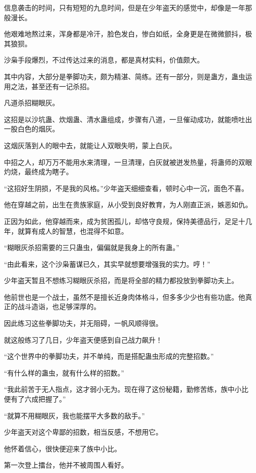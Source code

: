 \begin{this_body}
信息袭击的时间，只有短短的九息时间，但是在少年盗天的感觉中，却像是一年那般漫长。

他艰难地熬过来，浑身都是冷汗，脸色发白，惨白如纸，全身更是在微微颤抖，极其狼狈。

沙枭手段爆烈，不过传达过来的消息，都是真材实料，价值颇大。

其中内容，大部分是拳脚功夫，颇为精湛、简练。还有一部分，则是蛊方，蛊虫运用之法，甚至还有一记杀招。

凡道杀招糊眼灰。

这招是以沙坑蛊、炊烟蛊、清水蛊组成，步骤有八道，一旦催动成功，就能喷吐出一股白色的烟灰。

这烟灰落到人的眼中去，就能让人双眼失明，蒙上白灰。

中招之人，却万万不能用水来清理，一旦清理，白灰就被迸发热量，将蛊师的双眼灼烧，最终成为瞎子。

“这招好生阴损，不是我的风格。”少年盗天细细查看，顿时心中一沉，面色不喜。

他在穿越之前，出生在贵族家庭，从小受到良好教育，为人刚直正派，嫉恶如仇。

正因为如此，他穿越而来，成为贫困孤儿，却恪守良规，保持美德品行，足足十几年，就算有成人的智慧，也混得不如意。

“糊眼灰杀招需要的三只蛊虫，偏偏就是我身上的所有蛊。”

“由此看来，这个沙枭蓄谋已久，其实早就想要增强我的实力。哼！”

少年盗天暂且不想练习糊眼灰杀招，而是将全部的精力都投放到拳脚功夫上。

他前世也是一个战士，虽然不是擅长近身肉体格斗，但多多少少也有些功底。他真正的战斗造诣，也足够深厚的。

因此练习这些拳脚功夫，并无阻碍，一帆风顺得很。

就这般练习了几日，少年盗天便感到自己战力飙升！

“这个世界中的拳脚功夫，并不单纯，而是搭配蛊虫形成的完整招数。”

“有什么样的蛊虫，就有什么样的招数。”

“我此前苦于无人指点，这才弱小无为。现在得了这份秘籍，勤修苦练，族中小比便有了六成把握了。”

“就算不用糊眼灰，我也能摆平大多数的敌手。”

少年盗天对这个卑鄙的招数，相当反感，不想用它。

他怀着信心，很快便迎来了族中小比。

第一次登上擂台，他并不被周围人看好。


\end{this_body}
